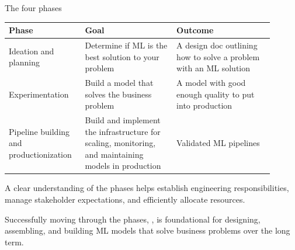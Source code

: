\begin{frame}{The four phases}
  \begin{withmargin}
    \begin{tdmain}
      \footnotesize
      \begin{tabular}{@{}p{0.24\linewidth}p{0.32\linewidth}p{0.34\linewidth}@{}}
        \toprule
        \textbf{Phase} & \textbf{Goal} & \textbf{Outcome}\\
        \midrule
        Ideation and planning & Determine if ML is the best solution to your
          problem & A design doc outlining how to solve a problem with an ML
          solution\\[0.4em]
        Experimentation & Build a model that solves the business problem
          & A model with good enough quality to put into production\\[0.4em]
        Pipeline building and productionization & Build and implement the
          infrastructure for scaling, monitoring, and maintaining models in
          production & Validated ML pipelines\\
        \bottomrule
      \end{tabular}
    \end{tdmain}
    \begin{tdmargin}
      A clear understanding of the phases helps establish engineering
      responsibilities, manage stakeholder expectations, and efficiently
      allocate resources.
      \par\medskip
      Successfully moving through the phases, , is
      foundational for designing, assembling, and building ML models that solve
      business problems over the long term.
    \end{tdmargin}
  \end{withmargin}
\end{frame}

